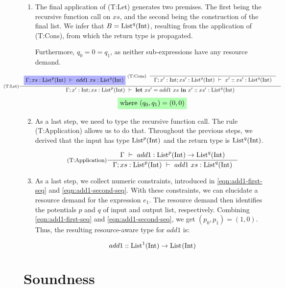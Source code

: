 \begin{example}
\begin{enumerate}[label=Step \Roman*:]
   \item The final application of (T:Let) generates two premises. The first being the recursive function call on \(xs\), and the second being the construction of the final list. We infer that \(B = \text{List}^{q}(\text{Int})\), resulting from the application of (T:Cons), from which the return type is propagated. 

Furthermore, \(q_0 = 0 = q_1\), as neither sub-expressions have any resource demand.

\[
   \hspace*{-2cm}
   \inference[(T:Let)]
   {
      \typingHighlight{\typing{\Gamma;xs:\ralist{p}{\typeint}}{add1~xs}{\ralist{q}{\typeint}}}
      \inference[(T:Cons)]
      {}
      {
         \typing{\Gamma;x':\typeint;xs':\ralist{q}{\typeint}}{\cons{x'}{xs'}}{\ralist{q}{\typeint}}
      }
   }
   {
      \typing{\Gamma;x':\typeint;xs:\ralist{p}{\typeint}}{\letexp{xs'}{add1~xs}{\cons{x'}{xs'}}}{\ralist{q}{\typeint}}
   }
\]
\begin{align}
   \constraintHighlight{\text{where } (q_0, q_1) = (0, 0)} \label{eqn:add1-second-seq}
\end{align}

   \item As a last step, we need to type the recursive function call. The rule (T:Application) allows us to do that. Throughout the previous steps, we derived that the input has type \(\text{List}^{p}(\text{Int})\) and the return type is \(\text{List}^{q}(\text{Int})\). 

\[
   \inference[(T:Application)]
   {
      \typing{\Gamma}{add1}{\ralist{p}{\typeint} \to \ralist{q}{\typeint}}
   }
   {
      \typing{\Gamma;xs:\ralist{p}{\typeint}}{add1~xs}{\ralist{q}{\typeint}}
   }
\]

\item As a last step, we collect numeric constraints, introduced in \cref{eqn:add1-first-seq} and \cref{eqn:add1-second-seq}. With these constraints, we can elucidate a resource demand for the expression \(e_1\). The resource demand then identifies the potentials \(p\) and \(q\) of input and output list, respectively. Combining \cref{eqn:add1-first-seq} and \cref{eqn:add1-second-seq}, we get \((p_0, p_1) = (1, 0)\). Thus, the resulting resource-aware type for \(add1\) is:

\[
   add1 :: \text{List}^{1}(\text{Int}) \to \text{List}^{}(\text{Int}) ^{}_{}
\]
\end{enumerate}
\end{example}

\section{Soundness}\label{sec:soundness-6}

